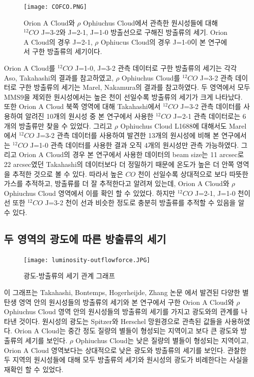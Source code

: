 \begin{figure}[h]
	\begin{center}
		\texttt{[image: COFCO.PNG]}
	\end{center}
	\caption{Orion A Cloud와 $\rho$ Ophiuchus Cloud에서 관측한 원시성들에 대해 $^{12}CO$ J=3-2와 J=2-1, J=1-0 방출선으로 구해진 방출류의 세기. Orion A Cloud의 경우 J=2-1, $\rho$ Ophiucus Cloud의 경우 J=1-0이 본 연구에서 구한 방출류의 세기이다.}
\end{figure}

Orion A Cloud를 $^{12}CO$ J=1-0, J=3-2 관측 데이터로 구한 방출류의 세기는 각각 Aso, Takahashi의 결과를 참고하였고, $\rho$ Ophiuchus Cloud를 $^{12}CO$ J=3-2 관측 데이터로 구한 방출류의 세기는 Marel, Nakamura의 결과를 참고하였다.\cite{Aso}\cite{Takahashi}\cite{Marel}\cite{Nakamura} 두 영역에서 모두 MMS9을 제외한 원시성에서는 높은 천이 선일수록 방출류의 세기가 크게 나타났다.
\\
또한 Orion A Cloud 북쪽 영역에 대해 Takahashi에서 $^{12}CO$ J=3-2 관측 데이터를 사용하여 알려진 10개의 원시성 중 본 연구에서 사용한 $^{12}CO$ J=2-1 관측 데이터로는 6개의 방출류만 찾을 수 있었다. 그리고 $\rho$ Ophiuchus Cloud L1688에 대해서도 Marel에서 $^{12}CO$ J=3-2 관측 데이터를 사용하여 발견한 13개의 원시성에 비해 본 연구에서는 $^{12}CO$ J=1-0 관측 데이터를 사용한 결과 오직 4개의 원시성만 관측 가능하였다.\cite{Takahashi}\cite{Marel} 그리고 Orion A Cloud의 경우 본 연구에서 사용한 데이터의 beam size는 11 arcsec로 22 arcsec였던 Takahashi의 데이터보다 더 정밀하기 때문에 온도가 높은 더 안쪽 영역을 추적한 것으로 볼 수 있다. 따라서 높은 $CO$ 천이 선일수록 상대적으로 보다 따뜻한 가스를 추적하고, 방출류를 더 잘 추적한다고 알려져 있는데, Orion A Cloud와 $\rho$ Ophiuchus Cloud 영역에서 이를 확인 할 수 있었다. 하지만 $^{12}CO$ J=2-1, J=1-0 천이 선 또한 $^{12}CO$ J=3-2 천이 선과 비슷한 정도로 충분히 방출류를 추적할 수 있음을 알 수 있다.


\subsection{두 영역의 광도에 따른 방출류의 세기}

\begin{figure}[h]
	\centering
	\texttt{[image: luminosity-outflowforce.JPG]}
	\caption{광도-방출류의 세기 관계 그래프}
\end{figure}

이 그래프는 Takahashi, Bontemps, Hogerheijde, Zhang 논문 에서 발견된 다양한 별 탄생 영역 안의 원시성들의 방출류의 세기와 본 연구에서 구한 Orion A Cloud와 $\rho$ Ophiuchus Cloud 영역 안의 원시성들의 방출류의 세기를 가지고 광도와의 관계를 나타낸 것이다.\cite{Takahashi} \cite{Bontemps} \cite{Hogerheijde} \cite{Zhang} 원시성의 광도는 Spitzer와 Herschel 망원경으로 관측된 값들을 사용하였다.\cite{OphDunham} \cite{Spitzer} \cite{HerschelFurlan} Orion A Cloud는 중간 정도 질량의 별들이 형성되는 지역이고 보다 큰 광도와 방출류의 세기를 보인다. $\rho$ Ophiuchus Cloud는 낮은 질량의 별들이 형성되는 지역이고, Orion A Cloud 영역보다는 상대적으로 낮은 광도와 방출류의 세기를 보인다. 관찰한 두 지역의 원시성들에 대해 모두 방출류의 세기와 원시성의 광도가 비례한다는 사실을 재확인 할 수 있었다.